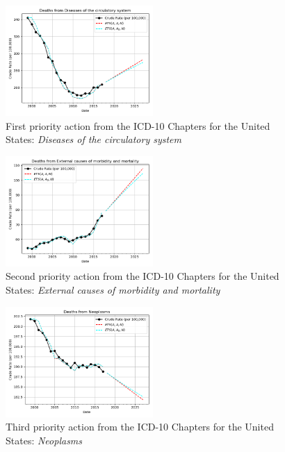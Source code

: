 \documentclass[10pt, a4paper, twocolumn]{IEEEconf}
\begin{document}
\begin{figure}[H]
  \centering
  \includegraphics[width=0.5\textwidth]{results/US_ICD10_CHAPTERS/Diseases_of_the_circulatory_system_ets.png}
  \caption{First priority action from the ICD-10 Chapters for the United States: \textit{Diseases of the circulatory system}}\label{fig:k5a}
\end{figure}

\begin{figure}[H]
  \centering
  \includegraphics[width=0.5\textwidth]{results/US_ICD10_CHAPTERS/External_causes_of_morbidity_and_mortality_ets.png}
  \caption{Second priority action from the ICD-10 Chapters for the United States: \textit{External causes of morbidity and mortality}}\label{fig:k5b}
\end{figure}

\begin{figure}[H]
  \centering
  \includegraphics[width=0.5\textwidth]{results/US_ICD10_CHAPTERS/Neoplasms_ets.png}
  \caption{Third priority action from the ICD-10 Chapters for the United States: \textit{Neoplasms}}\label{fig:k5c}
\end{figure}
\end{document}
